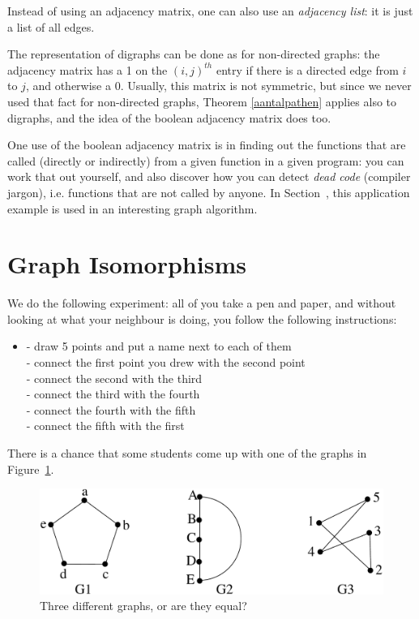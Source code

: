 Instead of using an adjacency matrix, one can also use an {\em
adjacency list}: it is just a list of all edges.


The representation of digraphs can be done as for non-directed graphs:
the adjacency matrix has a 1 on the $(i,j)^{th}$ entry if there is a
directed edge from $i$ to $j$, and otherwise a 0. Usually, this matrix
is not symmetric, but since we never used that fact for non-directed
graphs, Theorem \ref{aantalpathen} applies also to digraphs, and the
idea of the boolean adjacency matrix does too.

One use of the boolean adjacency matrix is in finding out the
functions that are called (directly or indirectly) from a given
function in a given program: you can work that out yourself, and also
discover how you can detect {\em dead code} (compiler jargon),
i.e. functions that are not called by anyone. In Section~,
this application example is used in an interesting graph algorithm.


\section{Graph Isomorphisms}

We do the following experiment: all of you take a pen and paper, and
without looking at what your neighbour is doing, you follow the
following instructions:

\begin{itemize}
\item[]
- draw 5 points and put a name next to each of them \\
- connect the first point you drew with the second point\\
- connect the second with the third\\
- connect the third with the fourth\\
- connect the fourth with the fifth\\
- connect the fifth with the first\\
\end{itemize}

There is a chance that some students come up with one of the graphs in
Figure~\ref{experiment1}.

\begin{figure}[ht]
\begin{center}
\includegraphics[width=0.6\linewidth,keepaspectratio]{experiment1}
\end{center}
\caption{Three different graphs, or are they equal?\label{experiment1}}
\end{figure}

